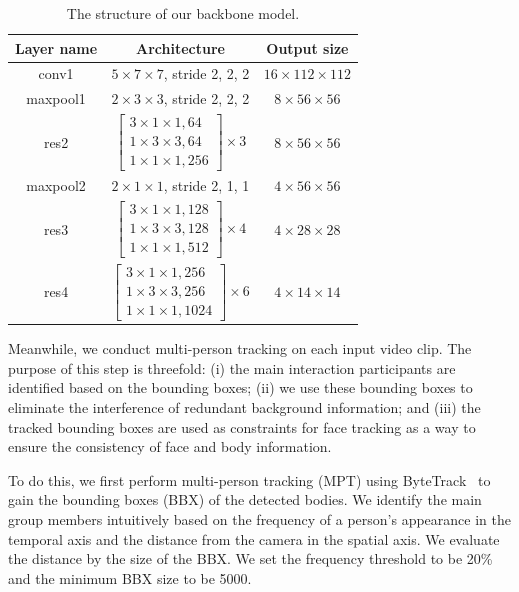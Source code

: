 \documentclass[VANCOUVER,STIX1COL]{WileyNJD-v2}
\begin{document}
\begin{table}[htb]
  \centering
  \caption{The structure of our backbone model.}
  \label{t:resnet3d}
  \begin{tabular}{ccc}
  \toprule
  \textbf{Layer name} & \textbf{Architecture} & \textbf{Output size} \\
  \midrule
  conv1 & $5\times7\times7$, stride 2, 2, 2 & $16\times112\times112$ \\
  \midrule
  maxpool1 & $2\times3\times3$, stride 2, 2, 2 & $8\times56\times56$ \\
  \midrule
  res2 & $\left[ \begin{array}{c} 3\times1\times1, 64 \\ 1\times3\times3, 64 \\ 1\times1\times1, 256 \end{array}\right]\times3$ & $8\times56\times56$ \\
  \midrule
  maxpool2 & $2\times1\times1$, stride 2, 1, 1 & $4\times56\times56$ \\
  \midrule
  res3 & $\left[ \begin{array}{c} 3\times1\times1, 128 \\ 1\times3\times3, 128 \\ 1\times1\times1, 512 \end{array}\right]\times4$ & $4\times28\times28$ \\
  \midrule
  res4 & $\left[ \begin{array}{c} 3\times1\times1, 256 \\ 1\times3\times3, 256 \\ 1\times1\times1, 1024 \end{array}\right]\times6$ & $4\times14\times14$ \\
  \bottomrule
  \end{tabular}
\end{table}

Meanwhile, we conduct multi-person tracking on each input video clip. The purpose of this step is threefold: (i) the main interaction participants are identified based on the bounding boxes; (ii) we use these bounding boxes to eliminate the interference of redundant background information; and (iii) the tracked bounding boxes are used as constraints for face tracking as a way to ensure the consistency of face and body information.

To do this, we first perform multi-person tracking (MPT) using ByteTrack~\cite{Zhang2021ByteTrack} to gain the bounding boxes (BBX) of the detected bodies. We identify the main group members intuitively based on the frequency of a person's appearance in the temporal axis and the distance from the camera in the spatial axis. We evaluate the distance by the size of the BBX. We set the frequency threshold to be 20\% and the minimum BBX size to be 5000.
\end{document}
